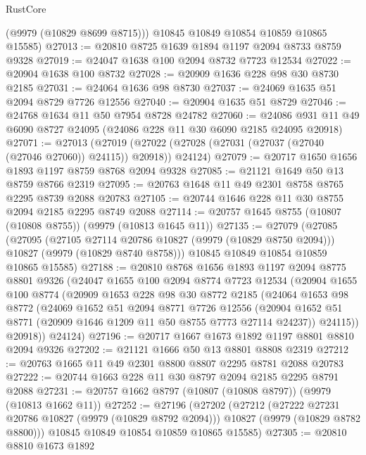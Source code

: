 \begin{lexlean}{RustCore}
\begin{coremodule}
        (@9979 (@10829 @8699 @8715)))
      @10845
      @10849
      @10854
      @10859
      @10865
      @15585)
@27013 := @20810 @8725 @1639 @1894 @1197 @2094 @8733 @8759 @9328
@27019 := @24047 @1638 @100 @2094 @8732 @7723 @12534
@27022 := @20904 @1638 @100 @8732
@27028 := @20909 @1636 @228 @98 @30 @8730 @2185
@27031 := @24064 @1636 @98 @8730
@27037 := @24069 @1635 @51 @2094 @8729 @7726 @12556
@27040 := @20904 @1635 @51 @8729
@27046 := @24768 @1634 @11 @50 @7954 @8728 @24782
@27060 := @24086 @931 @11 @49 @6090 @8727 @24095 (@24086 @228 @11 @30 @6090 @2185 @24095 @20918)
@27071 := @27013
    (@27019 (@27022 (@27028 (@27031 (@27037 (@27040 (@27046 @27060)) @24115)) @20918)) @24124)
@27079 := @20717 @1650 @1656 @1893 @1197 @8759 @8768 @2094 @9328
@27085 := @21121 @1649 @50 @13 @8759 @8766 @2319
@27095 := @20763 @1648 @11 @49 @2301 @8758 @8765 @2295 @8739 @2088 @20783
@27105 := @20744 @1646 @228 @11 @30 @8755 @2094 @2185 @2295 @8749 @2088
@27114 := @20757 @1645 @8755 (@10807 (@10808 @8755)) (@9979 (@10813 @1645 @11))
@27135 := @27079
    (@27085
      (@27095
        (@27105 @27114 @20786 @10827 (@9979 (@10829 @8750 @2094)))
        @10827
        (@9979 (@10829 @8740 @8758)))
      @10845
      @10849
      @10854
      @10859
      @10865
      @15585)
@27188 := @20810
    @8768
    @1656
    @1893
    @1197
    @2094
    @8775
    @8801
    @9326
    (@24047
      @1655
      @100
      @2094
      @8774
      @7723
      @12534
      (@20904
        @1655
        @100
        @8774
        (@20909
          @1653
          @228
          @98
          @30
          @8772
          @2185
          (@24064
            @1653
            @98
            @8772
            (@24069
              @1652
              @51
              @2094
              @8771
              @7726
              @12556
              (@20904 @1652 @51 @8771 (@20909 @1646 @1209 @11 @50 @8755 @7773 @27114 @24237))
              @24115))
          @20918))
      @24124)
@27196 := @20717 @1667 @1673 @1892 @1197 @8801 @8810 @2094 @9326
@27202 := @21121 @1666 @50 @13 @8801 @8808 @2319
@27212 := @20763 @1665 @11 @49 @2301 @8800 @8807 @2295 @8781 @2088 @20783
@27222 := @20744 @1663 @228 @11 @30 @8797 @2094 @2185 @2295 @8791 @2088
@27231 := @20757 @1662 @8797 (@10807 (@10808 @8797)) (@9979 (@10813 @1662 @11))
@27252 := @27196
    (@27202
      (@27212
        (@27222 @27231 @20786 @10827 (@9979 (@10829 @8792 @2094)))
        @10827
        (@9979 (@10829 @8782 @8800)))
      @10845
      @10849
      @10854
      @10859
      @10865
      @15585)
@27305 := @20810
    @8810
    @1673
    @1892

\end{coremodule}
\end{lexlean}
